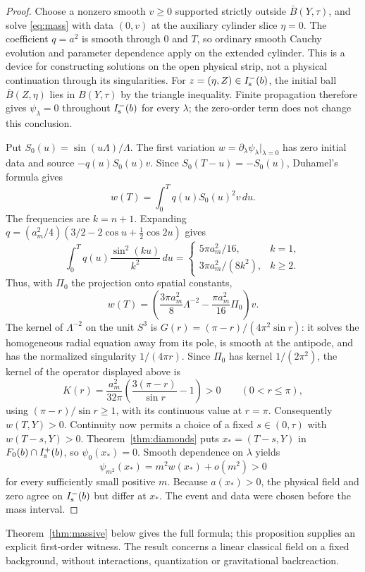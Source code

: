 \begin{proof}
Choose a nonzero smooth $v\ge0$ supported strictly outside
$\bar B(Y,\tau)$, and solve \eqref{eq:mass} with data $(0,v)$ at the
auxiliary cylinder slice $\eta=0$. The coefficient $q=a^2$ is smooth through
$0$ and $T$, so ordinary smooth Cauchy evolution and parameter dependence
apply on the extended cylinder. This is a device for constructing solutions
on the open physical strip, not a physical continuation through its
singularities. For $z=(\eta,Z)\in I^-_{\mathrm s}(b)$, the initial ball
$\bar B(Z,\eta)$ lies in $B(Y,\tau)$ by the triangle inequality. Finite
propagation therefore gives $\psi_\lambda=0$ throughout $I^-_{\mathrm s}(b)$ for every
$\lambda$; the zero-order term does not change this conclusion.

Put $S_0(u)=\sin(u\Lambda)/\Lambda$. The first variation
$w=\partial_\lambda\psi_\lambda|_{\lambda=0}$ has zero initial data and source
$-q(u)S_0(u)v$. Since $S_0(T-u)=-S_0(u)$, Duhamel's formula gives
\[
 w(T)=\int_0^T q(u)S_0(u)^2v\,du.
\]
The frequencies are $k=n+1$. Expanding
$q=(a_m^2/4)(3/2-2\cos u+\tfrac12\cos2u)$ gives
\[
 \int_0^T q(u)\frac{\sin^2(ku)}{k^2}\,du
 =\begin{cases}5\pi a_m^2/16,&k=1,\\
                 3\pi a_m^2/(8k^2),&k\ge2.
   \end{cases}
\]
Thus, with $\Pi_0$ the projection onto spatial constants,
\[
 w(T)=\left(\frac{3\pi a_m^2}{8}\Lambda^{-2}
                -\frac{\pi a_m^2}{16}\Pi_0\right)v.
\]
The kernel of $\Lambda^{-2}$ on the unit $S^3$ is
$G(r)=(\pi-r)/(4\pi^2\sin r)$: it solves the homogeneous radial equation
away from its pole, is smooth at the antipode, and has the normalized
singularity $1/(4\pi r)$. Since $\Pi_0$ has kernel $1/(2\pi^2)$, the kernel
of the operator displayed above is
\[
 K(r)=\frac{a_m^2}{32\pi}
       \left(\frac{3(\pi-r)}{\sin r}-1\right)>0\qquad(0<r\le\pi),
\]
using $(\pi-r)/\sin r\ge1$, with its continuous value at $r=\pi$.
Consequently $w(T,Y)>0$. Continuity now permits a choice of a fixed
$s\in(0,\tau)$ with $w(T-s,Y)>0$. Theorem~\ref{thm:diamonds} puts
$x_*=(T-s,Y)$ in $F_0(b)\cap I^+_{\mathrm s}(b)$, so $\psi_0(x_*)=0$.
Smooth dependence on $\lambda$ yields
\[
 \psi_{m^2}(x_*)=m^2w(x_*)+o(m^2)>0
\]
for every sufficiently small positive $m$. Because $a(x_*)>0$, the physical
field and zero agree on $I^-_{\mathrm s}(b)$ but differ at $x_*$. The event and data
were chosen before the mass interval.
\end{proof}

Theorem~\ref{thm:massive} below gives the full formula; this proposition
supplies an explicit first-order witness. The result concerns a
linear classical field on a fixed background, without interactions,
quantization or gravitational backreaction.
